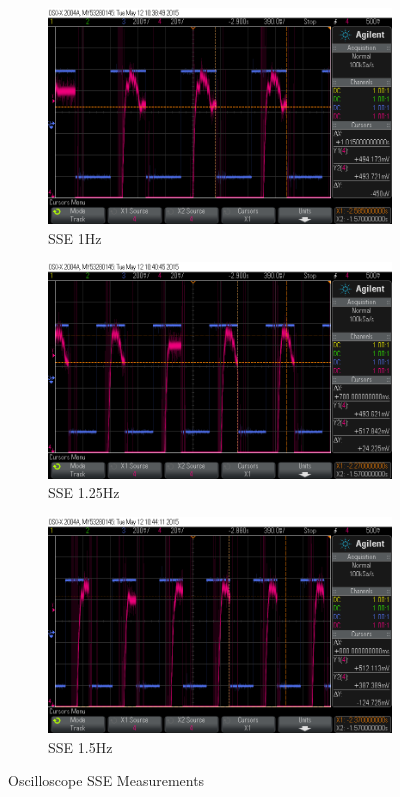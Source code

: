 \documentclass[11pt,a4paper]{article}
\begin{document}
\begin{enumerate}
\begin{figure}[H]
  \begin{subfigure}{0.5\textwidth}
  \includegraphics[width=0.95\linewidth]{Oscilloscope/PartD_1_0Hz_SSE.png}
  \caption{SSE 1Hz}
  \label{fig:subim2}
  \end{subfigure}
  \begin{subfigure}{0.5\textwidth}
  \includegraphics[width=0.95\linewidth]{Oscilloscope/PartD_1_25Hz_SSE.png}
  \caption{SSE 1.25Hz}
  \label{fig:subim2}
  \end{subfigure}

  \begin{subfigure}{0.5\textwidth}
  \includegraphics[width=0.95\linewidth]{Oscilloscope/PartD_1_50Hz_SSE.png}
  \caption{SSE 1.5Hz}
  \label{fig:subim2}
  \end{subfigure}
\caption{\label{fig:freqimpact}Oscilloscope SSE Measurements}
\end{figure}


\end{enumerate}
\end{document}
